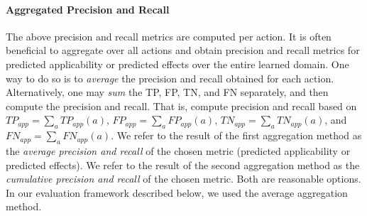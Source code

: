 \documentclass{article}
\theoremstyle{definition}
\theoremstyle{remark}
\newcommand{\app}{\ensuremath{\textit{app}}\xspace}
\newif\ifaddcomments
\newcommand{\roni}[1]{\ifaddcomments{\textcolor{red}{[Roni: #1]}}\fi}
\newcommand{\yarin}[1]{\ifaddcomments{\textcolor{teal}{[Yarin: #1]}}\fi}
\newcommand{\leo}[1]{\ifaddcomments{\textcolor{pink}{[Leonardo: #1]}}\fi}
\begin{document}
\roni{Add a concrete example of how to compute these metrics}
\yarin{I can add an example after we verify the different formulas, example for each or only for Predicted effects ?}



\paragraph{Aggregated Precision and Recall}

The above precision and recall metrics are computed per action. It is often beneficial to aggregate over all actions and obtain precision and recall metrics for predicted applicability or predicted effects over the entire learned domain. 
One way to do so is to \emph{average} the precision and recall obtained for each action. 
Alternatively, one may \emph{sum} the 
TP, FP, TN, and FN separately, and then compute the precision and recall. 
That is, compute precision and recall based on $TP_\app=\sum_a TP_\app(a)$, 
$FP_\app=\sum_a FP_\app(a)$,
$TN_\app=\sum_a TN_\app(a)$, and
$FN_\app=\sum_a FN_\app(a)$. 
We refer to the result of the first aggregation method as the \emph{average precision and recall} of the chosen metric (predicted applicability or predicted effects). 
We refer to the result of the second aggregation method as the \emph{cumulative precision and recall} of the chosen metric.  
Both are reasonable options. 
In our evaluation framework described below, we used the average aggregation method. 
\leo{For syntactic precision the `simple` one, this is because e.g. if there are 2 actions with 1 and 10 precs/effs resp., then the precision averaged over the two actions weights 1 mistake in the first action differently from 1 mistake in the second one, I am not sure we want this. For the predictive power metrics we aggregated using the `equal-action` method, this is because the number of samples can be very unbalanced (e.g. 1 vs 100). I do not think there is a `right` one, so I stored both metrics during the experiments and we can choose}
\roni{In the syntactic metrics this is not an issue because we measure based on the model, not the states in the test set. }
\end{document}
